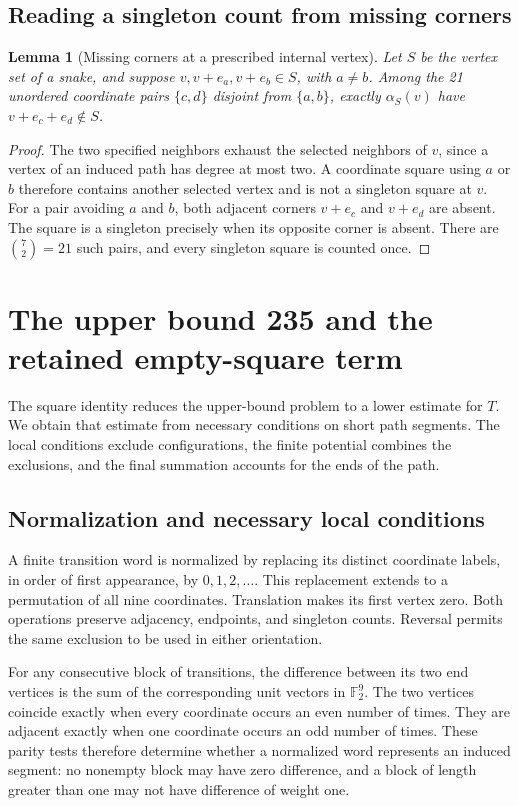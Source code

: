 \documentclass[11pt,a4paper]{article}
\newtheorem{lemma}[theorem]{Lemma}
\theoremstyle{definition}
\theoremstyle{remark}
\begin{document}
\subsection{Reading a singleton count from missing corners}
\begin{lemma}[Missing corners at a prescribed internal vertex]\label{lem:window-missing-corners}
Let $S$ be the vertex set of a snake, and suppose $v,v+e_a,v+e_b\in S$, with $a\ne b$. Among the 21 unordered coordinate pairs $\{c,d\}$ disjoint from $\{a,b\}$, exactly $\alpha_S(v)$ have $v+e_c+e_d\notin S$.
\end{lemma}
\begin{proof}
The two specified neighbors exhaust the selected neighbors of $v$, since a vertex of an induced path has degree at most two. A coordinate square using $a$ or $b$ therefore contains another selected vertex and is not a singleton square at $v$. For a pair avoiding $a$ and $b$, both adjacent corners $v+e_c$ and $v+e_d$ are absent. The square is a singleton precisely when its opposite corner is absent. There are $\binom{7}{2}=21$ such pairs, and every singleton square is counted once.
\end{proof}

\section{The upper bound 235 and the retained empty-square term}\label{sec:upper-proof}
The square identity reduces the upper-bound problem to a lower estimate for $T$. We obtain that estimate from necessary conditions on short path segments. The local conditions exclude configurations, the finite potential combines the exclusions, and the final summation accounts for the ends of the path.
\subsection{Normalization and necessary local conditions}
A finite transition word is normalized by replacing its distinct coordinate labels, in order of first appearance, by $0,1,2,\ldots$. This replacement extends to a permutation of all nine coordinates. Translation makes its first vertex zero. Both operations preserve adjacency, endpoints, and singleton counts. Reversal permits the same exclusion to be used in either orientation.

For any consecutive block of transitions, the difference between its two end vertices is the sum of the corresponding unit vectors in $\mathbb F_2^9$. The two vertices coincide exactly when every coordinate occurs an even number of times. They are adjacent exactly when one coordinate occurs an odd number of times. These parity tests therefore determine whether a normalized word represents an induced segment: no nonempty block may have zero difference, and a block of length greater than one may not have difference of weight one.
\end{document}
